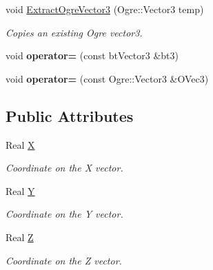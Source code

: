 \begin{DoxyCompactItemize}
void \hyperlink{classPhysVector3_a422acbc95f72d00a26cb477ab7db5e87}{ExtractOgreVector3} (Ogre::Vector3 temp)
\begin{DoxyCompactList}\small\item\em Copies an existing Ogre vector3. \item\end{DoxyCompactList}\item 
\hypertarget{classPhysVector3_a76af5753ff1a65261bcb0d543999eb3e}{
void {\bfseries operator=} (const btVector3 \&bt3)}
\label{da/d11/classPhysVector3_a76af5753ff1a65261bcb0d543999eb3e}

\item 
\hypertarget{classPhysVector3_a00323a54e86ab2e6cf41ddbfbc2a97cd}{
void {\bfseries operator=} (const Ogre::Vector3 \&OVec3)}
\label{da/d11/classPhysVector3_a00323a54e86ab2e6cf41ddbfbc2a97cd}

\end{DoxyCompactItemize}
\subsection*{Public Attributes}
\begin{DoxyCompactItemize}
\item 
\hypertarget{classPhysVector3_a8fb29119f25c996da9d091fd6ce5693f}{
Real \hyperlink{classPhysVector3_a8fb29119f25c996da9d091fd6ce5693f}{X}}
\label{da/d11/classPhysVector3_a8fb29119f25c996da9d091fd6ce5693f}

\begin{DoxyCompactList}\small\item\em Coordinate on the X vector. \item\end{DoxyCompactList}\item 
\hypertarget{classPhysVector3_a45b7fdd4361f9e31b36eab4551c1e558}{
Real \hyperlink{classPhysVector3_a45b7fdd4361f9e31b36eab4551c1e558}{Y}}
\label{da/d11/classPhysVector3_a45b7fdd4361f9e31b36eab4551c1e558}

\begin{DoxyCompactList}\small\item\em Coordinate on the Y vector. \item\end{DoxyCompactList}\item 
\hypertarget{classPhysVector3_a728c752b813e3191231904f629050a74}{
Real \hyperlink{classPhysVector3_a728c752b813e3191231904f629050a74}{Z}}
\label{da/d11/classPhysVector3_a728c752b813e3191231904f629050a74}

\begin{DoxyCompactList}\small\item\em Coordinate on the Z vector. \item\end{DoxyCompactList}\end{DoxyCompactItemize}


